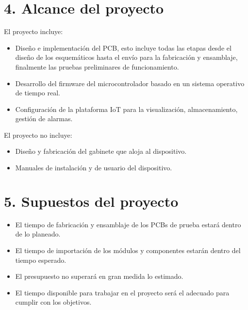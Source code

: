 \documentclass[
11pt, %
codirector, %
]{charter}
\begin{document}
\section{4. Alcance del proyecto}
\label{sec:alcance}
El proyecto incluye:
\begin{itemize}
	\item Diseño e implementación del PCB, esto incluye todas las etapas desde el diseño de los esquemáticos hasta el envío para la fabricación y ensamblaje, finalmente las pruebas preliminares de funcionamiento.
	\item Desarrollo del firmware del microcontrolador basado en un sistema operativo de tiempo real.
	\item Configuración de la plataforma IoT para la visualización, almacenamiento, gestión de alarmas.
\end{itemize}
El proyecto no incluye:
\begin{itemize}
	\item Diseño y fabricación del gabinete que aloja al dispositivo.
	\item Manuales de instalación y de usuario del dispositivo.
\end{itemize}

\newpage
\section{5. Supuestos del proyecto}
\label{sec:supuestos}

\begin{itemize}
	\item El tiempo de fabricación y ensamblaje de los PCBs de prueba estará dentro de lo planeado.
	\item El tiempo de importación de los módulos y componentes estarán dentro del tiempo esperado.
	\item El presupuesto no superará en gran medida lo estimado.
	\item El tiempo disponible para trabajar en el proyecto será el adecuado para cumplir con
	los objetivos.
 
\end{itemize}
\end{document}
